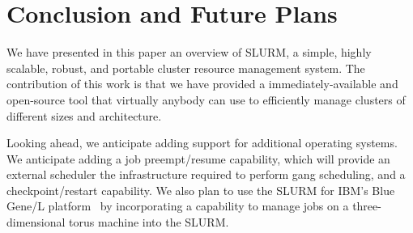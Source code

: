 \section{Conclusion and Future Plans}

We have presented in this paper an overview of SLURM, a simple, highly scalable, robust,
and portable cluster resource management system.
The contribution of this work is that we have provided a immediately-available
and open-source tool that virtually anybody can use to efficiently manage clusters of
different sizes and architecture.

Looking ahead, we anticipate adding support for additional
operating systems.
We anticipate adding a job preempt/resume capability, which will
provide an external scheduler the infrastructure
required to perform gang scheduling, and a checkpoint/restart capability.
We also plan to use the SLURM for IBM's Blue Gene/L platform~\cite{BGL} by incorporating a capability
to manage jobs on a three-dimensional torus machine into the SLURM.
